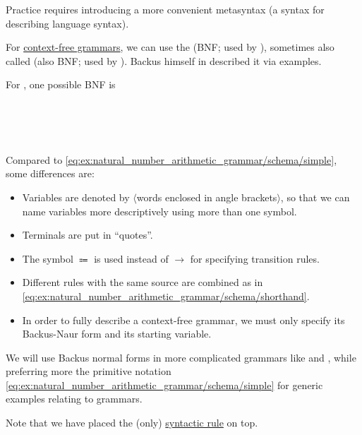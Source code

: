 \begin{remark}\label{rem:backus_normal_form}
  Practice requires introducing a more convenient metasyntax (a syntax for describing language syntax).

  For \hyperref[def:chomsky_hierarchy/context_free]{context-free grammars}, we can use the  (BNF; used by ), sometimes also called  (also BNF; used by ). Backus himself in \cite[14]{Backus1958} described it via examples.

  For , one possible BNF is
  \begin{bnf*}
         { \bnfor \bnftsq{(} \bnfsp {} \bnfsp {} \bnfsp {} \bnfsp \bnftsq{)}} \\
          {\bnftsq{\( + \)} \bnfor \bnftsq{\( \times \)}} \\
     { \bnfor {} \bnfor {} \bnfsp {}} \\
       { \bnfor {} \bnfsp {} \bnfor {} \bnfor {} \bnfsp {}}
  \end{bnf*}

  Compared to \eqref{eq:ex:natural_number_arithmetic_grammar/schema/simple}, some differences are:
  \begin{itemize}
    \item Variables are denoted by \( \langle \)words enclosed in angle brackets\( \rangle \), so that we can name variables more descriptively using more than one symbol.
    \item Terminals are put in \enquote{quotes}.
    \item The symbol \( \Coloneqq \) is used instead of \( \to \) for specifying transition rules.
    \item Different rules with the same source are combined as in \eqref{eq:ex:natural_number_arithmetic_grammar/schema/shorthand}.
    \item In order to fully describe a context-free grammar, we must only specify its Backus-Naur form and its starting variable.
  \end{itemize}
\end{remark}
\begin{comments}
  \item We will use Backus normal forms in more complicated grammars like  and , while preferring more the primitive notation \eqref{eq:ex:natural_number_arithmetic_grammar/schema/simple} for generic examples relating to grammars.
  \item Note that we have placed the (only) \hyperref[rem:abstract_syntax_tree/syntactic]{syntactic rule} on top.
\end{comments}

